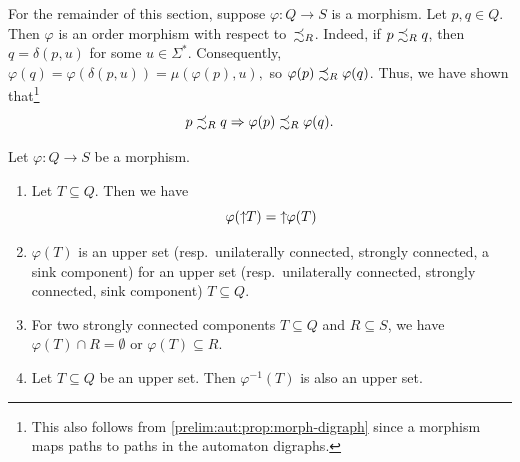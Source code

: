 For the remainder of this section, suppose $\varphi \colon Q \to S$ is a morphism.
Let $p,q \in Q$. 
Then $\varphi$ is an order morphism with respect to~$\precsim_R$.
Indeed, if $p \precsim_R q$, then $q = \delta(p,u)$ for some $u \in \Sigma^*$.
Consequently, 
$
\varphi(q) = \varphi(\delta(p,u)) = \mu(\varphi(p),u),
$
so $\varphi(p) \precsim_R \varphi(q)$.
Thus, we have shown that\footnote{This also 
	follows from \cref{prelim:aut:prop:morph-digraph}
	since a morphism maps paths to paths in the automaton digraphs.}
\begin{equation}
	p \precsim_R q \Rightarrow \varphi(p) \precsim_R \varphi(q). \label{prelim:eqn:morph-reachability-order}	
\end{equation}

\begin{proposition} \label{prelim:automata:morpisms:reachability:prop:images}
Let $\varphi \colon Q \to S$ be a morphism. %

\begin{enumerate}
\item \label{prelim:automata:morpisms:reachability:prop:images:principal-upper-set} Let $T \subseteq Q$.
Then we have
\begin{equation}  \label{prelim:eqn:morph-principal-upper-set}
\varphi(\mbox{\ensuremath{\displaystyle \uparrow \!\!T}}) = \mbox{\ensuremath{\displaystyle \uparrow \!\!\varphi(T)}}
\end{equation}

\item  \label{prelim:fact:morphism-sink} \label{prelim:automata:morpisms:reachability:prop:images:preservation}
$\varphi(T)$ is an upper set (resp.~unilaterally connected, strongly connected, a sink component) for an upper set (resp.~unilaterally connected, strongly connected, sink component) $T \subseteq Q$.

\item \label{prelim:automata:morpisms:reachability:prop:images:twoSCC} For two strongly connected components $T \subseteq Q$ and $R \subseteq S$,
 we have $\varphi(T) \cap R = \emptyset$ or $\varphi(T) \subseteq R$.
 
\item \label{prelim:automata:morpisms:reachability:prop:images:inverse} Let $T \subseteq Q$
 be an upper set. Then $\varphi^{-1}(T)$ is also an upper set.
\end{enumerate}
\end{proposition}
